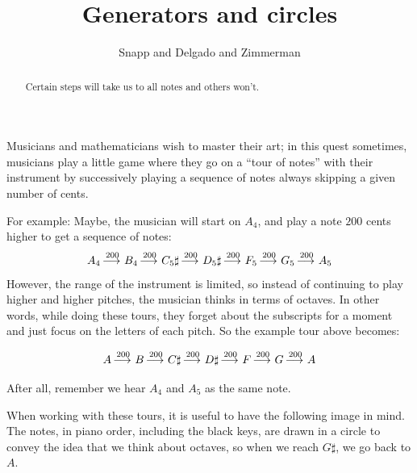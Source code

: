 \documentclass[12pt,noauthor,nooutcomes,hints, handout]{ximera}
\author{Snapp and Delgado and Zimmerman}
\title{Generators and circles}
\begin{document}
\begin{abstract}
  Certain steps will take us to all notes and others won't.
\end{abstract}
\maketitle





Musicians and mathematicians wish to master their art; in this quest sometimes, musicians play a little game where they go on a ``tour of notes'' with their instrument by successively playing a sequence of notes always skipping a given number of cents. 

For example: Maybe, the musician will start on $A_4$, and play a note $200$ cents higher to get a sequence of notes:
\[
A_4 \mathop{\longrightarrow\,}\limits^{200} B_4 \mathop{\longrightarrow\,}\limits^{200} C_5\sharp \mathop{\longrightarrow\,}\limits^{200} D_5\sharp \mathop{\longrightarrow\,}\limits^{200} F_5 \mathop{\longrightarrow\,}\limits^{200} G_5 \mathop{\longrightarrow\,}\limits^{200} A_5
\]
However, the range of the instrument is limited, so instead of continuing to play higher and higher pitches, the musician thinks in terms of octaves. In other words, while doing these tours, they forget about the subscripts for a moment and just focus on the letters of each pitch. So the example tour above becomes:

\[
A \mathop{\longrightarrow\,}\limits^{200} B \mathop{\longrightarrow\,}\limits^{200} C\sharp \mathop{\longrightarrow\,}\limits^{200} D\sharp \mathop{\longrightarrow\,}\limits^{200} F \mathop{\longrightarrow\,}\limits^{200} G \mathop{\longrightarrow\,}\limits^{200} A
\]

After all, remember we hear $A_4$ and $A_5$ as the same note.


When working with these tours, it is useful to have the following image in mind. The notes, in piano order, including the black keys, are drawn in a circle to convey the idea that we think about octaves, so when we reach $G\sharp$, we go back to $A$.

\begin{center}
    \newcommand*{\mynotes}{$A$,$A\sharp$,$B$,$C$,$C\sharp$,$D$,$D\sharp$,$E$,$F$,$F\sharp$,$G$,$G\sharp$}
\circleTour{\mynotes}{100}
\end{center}
\end{document}
